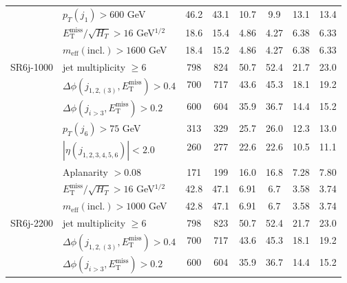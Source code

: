 \documentclass[10pt,fleqn]{article}
\newcommand{\met}{E^\mathrm{miss}_\mathrm{T}}
\newcommand{\meff}{m_\mathrm{eff}}
\begin{document}
\begin{table}[H]
\begin{tabular}{c|l|c|c|c|c|c|c}
             & $p_T(j_1) > 600$ GeV                            &     46.2   &   43.1    &  10.7      &   9.9     &      13.1    &   13.4         \\           
             & $\met/\sqrt{H_T} > 16$ GeV$^{1/2}$              &     18.6   &   15.4    &  4.86      &   4.27    &      6.38    &   6.33         \\    
             & $\meff(\mathrm{incl.}) > 1600$ GeV              &     18.4   &   15.2    &  4.86      &   4.27    &      6.38    &   6.33         \\ \midrule       
SR6j-1000    & jet multiplicity $\geq 6$                       &     798    &   824     &  50.7      &   52.4    &      21.7    &   23.0         \\
             & $\Delta\phi(j_{1,2,(3)},\met) > 0.4$            &     700    &   717     &  43.6      &   45.3    &      18.1    &   19.2         \\
             & $\Delta\phi(j_{i>3},\met) > 0.2$                &     600    &   604     &  35.9      &   36.7    &      14.4    &   15.2         \\      
             & $p_T(j_6) > 75$ GeV                             &     313    &   329     &  25.7      &   26.0    &      12.3    &   13.0         \\           
             & $|\eta(j_{1,2,3,4,5,6})|< 2.0$                  &     260    &   277     &  22.6      &   22.6    &      10.5    &   11.1         \\           
             & Aplanarity $> 0.08$                             &     171    &   199     &  16.0      &   16.8    &      7.28    &   7.80        \\                      
             & $\met/\sqrt{H_T} > 16$ GeV$^{1/2}$              &     42.8   &   47.1    &  6.91      &   6.7     &      3.58    &   3.74         \\    
             & $\meff(\mathrm{incl.}) > 1000$ GeV              &     42.8   &   47.1    &  6.91      &   6.7     &      3.58    &   3.74         \\ \midrule        
SR6j-2200    & jet multiplicity $\geq 6$                       &     798    &   823     &  50.7      &   52.4    &      21.7    &   23.0         \\
             & $\Delta\phi(j_{1,2,(3)},\met) > 0.4$            &     700    &   717     &  43.6      &   45.3    &      18.1    &   19.2         \\
             & $\Delta\phi(j_{i>3},\met) > 0.2$                &     600    &   604     &  35.9      &   36.7    &      14.4    &   15.2         \\      

\end{tabular}
\end{table}
\end{document}
